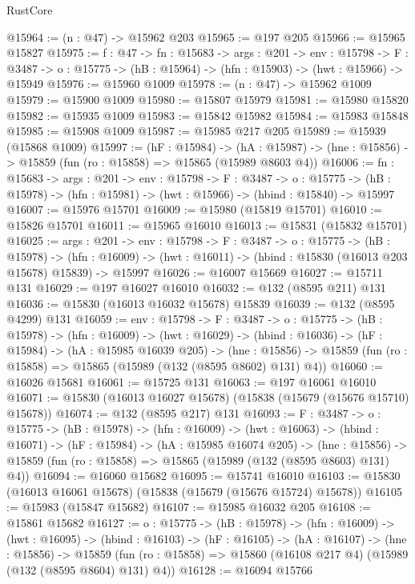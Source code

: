\begin{lexlean}{RustCore}
\begin{coremodule}
@15964 := (n : @47) -> @15962 @203
@15965 := @197 @205
@15966 := @15965 @15827
@15975 := {f : @47} ->
  {fn : @15683} ->
  {args : @201} ->
  {env : @15798} ->
  {F : @3487} -> {o : @15775} -> (hB : @15964) -> (hfn : @15903) -> (hwt : @15966) -> @15949
@15976 := @15960 @1009
@15978 := (n : @47) -> @15962 @1009
@15979 := @15900 @1009
@15980 := @15807 @15979
@15981 := @15980 @15820
@15982 := @15935 @1009
@15983 := @15842 @15982
@15984 := @15983 @15848
@15985 := @15908 @1009
@15987 := @15985 @217 @205
@15989 := @15939 (@15868 @1009)
@15997 := (hF : @15984) ->
  (hA : @15987) -> (hne : @15856) -> @15859 (fun (ro : @15858) => @15865 (@15989 @8603 @4))
@16006 := {fn : @15683} ->
  {args : @201} ->
  {env : @15798} ->
  {F : @3487} ->
  {o : @15775} -> (hB : @15978) -> (hfn : @15981) -> (hwt : @15966) -> (hbind : @15840) -> @15997
@16007 := @15976 @15701
@16009 := @15980 (@15819 @15701)
@16010 := @15826 @15701
@16011 := @15965 @16010
@16013 := @15831 (@15832 @15701)
@16025 := {args : @201} ->
  {env : @15798} ->
  {F : @3487} ->
  {o : @15775} ->
  (hB : @15978) ->
  (hfn : @16009) -> (hwt : @16011) -> (hbind : @15830 (@16013 @203 @15678) @15839) -> @15997
@16026 := @16007 @15669
@16027 := @15711 @131
@16029 := @197 @16027 @16010
@16032 := @132 (@8595 @211) @131
@16036 := @15830 (@16013 @16032 @15678) @15839
@16039 := @132 (@8595 @4299) @131
@16059 := {env : @15798} ->
  {F : @3487} ->
  {o : @15775} ->
  (hB : @15978) ->
  (hfn : @16009) ->
  (hwt : @16029) ->
  (hbind : @16036) ->
  (hF : @15984) ->
  (hA : @15985 @16039 @205) ->
  (hne : @15856) -> @15859 (fun (ro : @15858) => @15865 (@15989 (@132 (@8595 @8602) @131) @4))
@16060 := @16026 @15681
@16061 := @15725 @131
@16063 := @197 @16061 @16010
@16071 := @15830 (@16013 @16027 @15678) (@15838 (@15679 (@15676 @15710) @15678))
@16074 := @132 (@8595 @217) @131
@16093 := {F : @3487} ->
  {o : @15775} ->
  (hB : @15978) ->
  (hfn : @16009) ->
  (hwt : @16063) ->
  (hbind : @16071) ->
  (hF : @15984) ->
  (hA : @15985 @16074 @205) ->
  (hne : @15856) -> @15859 (fun (ro : @15858) => @15865 (@15989 (@132 (@8595 @8603) @131) @4))
@16094 := @16060 @15682
@16095 := @15741 @16010
@16103 := @15830 (@16013 @16061 @15678) (@15838 (@15679 (@15676 @15724) @15678))
@16105 := @15983 (@15847 @15682)
@16107 := @15985 @16032 @205
@16108 := @15861 @15682
@16127 := {o : @15775} ->
  (hB : @15978) ->
  (hfn : @16009) ->
  (hwt : @16095) ->
  (hbind : @16103) ->
  (hF : @16105) ->
  (hA : @16107) ->
  (hne : @15856) ->
  @15859 (fun (ro : @15858) => @15860 (@16108 @217 @4) (@15989 (@132 (@8595 @8604) @131) @4))
@16128 := @16094 @15766

\end{coremodule}
\end{lexlean}
